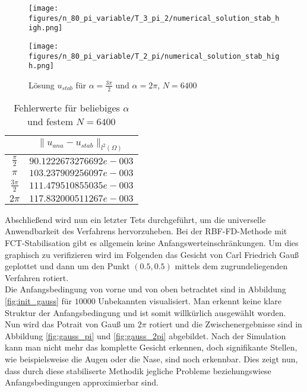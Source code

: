 \documentclass[12pt,titlepage]{article}
\begin{document}
\begin{figure}[H]
\hspace{0.1cm}
\begin{minipage}{0.4\textwidth}
\texttt{[image: figures/n\_80\_pi\_variable/T\_3\_pi\_2/numerical\_solution\_stab\_high.png]}
\end{minipage}
\hspace{1.4cm}
\begin{minipage}{0.4\textwidth}
\texttt{[image: figures/n\_80\_pi\_variable/T\_2\_pi/numerical\_solution\_stab\_high.png]}
\end{minipage}
\caption{Lösung $u_{stab}$ für $\alpha=\frac{3\pi}{2}$ und $\alpha=2\pi$, $N=6400$}
\label{fig:stab_80_2pi}
\end{figure}
\noindent
\begin{table}[H]
\centering
\begin{tabular}[\textwidth]{|c|c|}
\hline
  & $\|u_{ana}-u_{stab}\|_{l^2(\Omega)}$\\
\hline
$\frac{\pi}{2}$ & $90.1222673276692e-003$\\
$\pi$ & $103.237909256097e-003$\\
\hline
$\frac{3\pi}{2}$ & $111.479510855035e-003$\\
$2\pi$ & $117.832000511267e-003$\\
\hline
\end{tabular}
\caption{Fehlerwerte für beliebiges $\alpha$ und festem $N=6400$}
\label{tab:fehler_N_rotation}
\end{table}
\noindent
Abschließend wird nun ein letzter Tets durchgeführt, um die universelle Anwendbarkeit des Verfahrens hervorzuheben. Bei der RBF-FD-Methode mit FCT-Stabilisation gibt es allgemein keine Anfangswerteinschränkungen. Um dies graphisch zu verifizieren wird im Folgenden das Gesicht von Carl Friedrich Gauß geplottet und dann um den Punkt $(0.5,0.5)$ mittels dem zugrundeliegenden Verfahren rotiert.\\
Die Anfangsbedingung von vorne und von oben betrachtet sind in Abbildung \ref{fig:init_gauss} für $10000$ Unbekannten visualisiert. Man erkennt keine klare Struktur der Anfangsbedingung und ist somit willkürlich ausgewählt worden. Nun wird das Potrait von Gauß um $2\pi$ rotiert und die Zwischenergebnisse sind in Abbildung \ref{fig:gauss_pi} und \ref{fig:gauss_2pi} abgebildet. Nach der Simulation kann man nicht mehr das komplette Gesicht erkennen, doch signifikante Stellen, wie beispielsweise die Augen oder die Nase, sind noch erkennbar. Dies zeigt nun, dass durch diese stabiliserte Methodik jegliche Probleme beziehungswiese Anfangsbedingungen approximierbar sind. 
\end{document}
